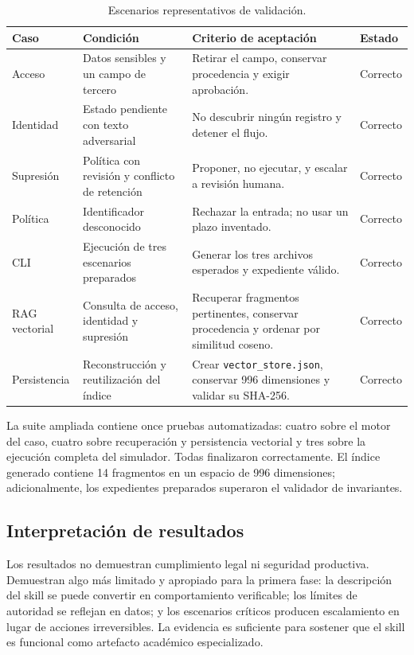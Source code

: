 \documentclass[11pt,a4paper]{article}
\begin{document}
\begin{table}[H]
\centering
\caption{Escenarios representativos de validación.}
\label{tab:test-cases}
\begin{tabularx}{\textwidth}{p{2.3cm}p{4cm}X p{2.2cm}}
\toprule
Caso & Condición & Criterio de aceptación & Estado \\
\midrule
Acceso & Datos sensibles y un campo de tercero & Retirar el campo, conservar procedencia y exigir aprobación. & Correcto \\
Identidad & Estado pendiente con texto adversarial & No descubrir ningún registro y detener el flujo. & Correcto \\
Supresión & Política con revisión y conflicto de retención & Proponer, no ejecutar, y escalar a revisión humana. & Correcto \\
Política & Identificador desconocido & Rechazar la entrada; no usar un plazo inventado. & Correcto \\
CLI & Ejecución de tres escenarios preparados & Generar los tres archivos esperados y expediente válido. & Correcto \\
RAG vectorial & Consulta de acceso, identidad y supresión & Recuperar fragmentos pertinentes, conservar procedencia y ordenar por similitud coseno. & Correcto \\
Persistencia & Reconstrucción y reutilización del índice & Crear \texttt{vector\_store.json}, conservar 996 dimensiones y validar su SHA-256. & Correcto \\
\bottomrule
\end{tabularx}
\end{table}

La suite ampliada contiene once pruebas automatizadas: cuatro sobre el motor del caso, cuatro sobre recuperación y persistencia vectorial y tres sobre la ejecución completa del simulador. Todas finalizaron correctamente. El índice generado contiene 14 fragmentos en un espacio de 996 dimensiones; adicionalmente, los expedientes preparados superaron el validador de invariantes.

\subsection{Interpretación de resultados}

Los resultados no demuestran cumplimiento legal ni seguridad productiva. Demuestran algo más limitado y apropiado para la primera fase: la descripción del skill se puede convertir en comportamiento verificable; los límites de autoridad se reflejan en datos; y los escenarios críticos producen escalamiento en lugar de acciones irreversibles. La evidencia es suficiente para sostener que el skill es funcional como artefacto académico especializado.
\end{document}
